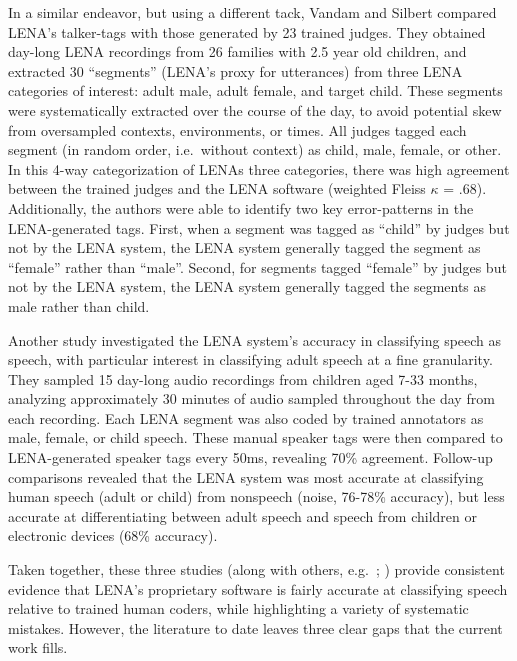 \documentclass[man,floatsintext]{apa6}
\theoremstyle{definition}
\theoremstyle{definition}
\theoremstyle{definition}
\theoremstyle{remark}
\begin{document}
In a similar endeavor, but using a different tack, Vandam and Silbert
\citeyearpar{Vandam2016} compared LENA's talker-tags with those
generated by 23 trained judges. They obtained day-long LENA recordings
from 26 families with 2.5 year old children, and extracted 30
\enquote{segments} (LENA's proxy for utterances) from three LENA
categories of interest: adult male, adult female, and target child.
These segments were systematically extracted over the course of the day,
to avoid potential skew from oversampled contexts, environments, or
times. All judges tagged each segment (in random order, i.e.~without
context) as child, male, female, or other. In this 4-way categorization
of LENAs three categories, there was high agreement between the trained
judges and the LENA software (weighted Fleiss \(\kappa\) = .68).
Additionally, the authors were able to identify two key error-patterns
in the LENA-generated tags. First, when a segment was tagged as
\enquote{child} by judges but not by the LENA system, the LENA system
generally tagged the segment as \enquote{female} rather than
\enquote{male}. Second, for segments tagged \enquote{female} by judges
but not by the LENA system, the LENA system generally tagged the
segments as male rather than child.

Another study \citep{Lehet2018} investigated the LENA system's accuracy
in classifying speech as speech, with particular interest in classifying
adult speech at a fine granularity. They sampled 15 day-long audio
recordings from children aged 7-33 months, analyzing approximately 30
minutes of audio sampled throughout the day from each recording. Each
LENA segment was also coded by trained annotators as male, female, or
child speech. These manual speaker tags were then compared to
LENA-generated speaker tags every 50ms, revealing 70\% agreement.
Follow-up comparisons revealed that the LENA system was most accurate at
classifying human speech (adult or child) from nonspeech (noise, 76-78\%
accuracy), but less accurate at differentiating between adult speech and
speech from children or electronic devices (68\% accuracy).

Taken together, these three studies (along with others,
e.g.~\citet{Mccauley20}; \citet{Soderstrom}) provide consistent evidence
that LENA's proprietary software is fairly accurate at classifying
speech relative to trained human coders, while highlighting a variety of
systematic mistakes. However, the literature to date leaves three clear
gaps that the current work fills.
\end{document}
